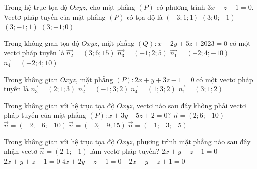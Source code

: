 \begin{ex}%
		Trong hệ trục tọa độ $Oxyz$, cho mặt phẳng $(P)$ có phương trình $3x-z+1=0$. Vectơ pháp tuyến của mặt phẳng $(P)$ có tọa độ là
	\choice
	{$(-3;1;1)$}
	{\True $(3;0;-1)$}
	{$(3;-1;1)$}
	{$(3;-1;0)$}
\end{ex}


\begin{ex}%
	Trong không gian tọa độ $Oxyz$, mặt phẳng $(Q) \colon x-2y+5z+2023=0$ có một vectơ pháp tuyến là
	\choice
	{$\overrightarrow{n_2}=(3;6;15)$}
	{$\overrightarrow{n_3}=(-1;2;5)$}
	{\True $\overrightarrow{n_1}=(-2;4;-10)$}
	{$\overrightarrow{n_4}=(-2;4;10)$}
\end{ex}

\begin{ex}%
Trong không gian $Oxyz$, mặt phẳng $(P) \colon 2x+y+3z-1=0$ có một vectơ pháp tuyến là
	\choice
	{$\overrightarrow{n_3}=(2;1;3)$}
	{$\overrightarrow{n_2}=(-1;3;2)$}
	{$\overrightarrow{n_4}=(1;3;2)$}
	{$\overrightarrow{n_1}=(3;1;2)$}
\end{ex}

\begin{ex}%
	Trong không gian với hệ trục tọa độ $Oxyz$, vectơ nào sau đây không phải vectơ pháp tuyến của mặt phẳng $(P) \colon x+3y-5z+2=0$?
	\choice
	{$\overrightarrow{n}=(2;6;-10)$}
	{\True $\overrightarrow{n}=(-2;-6;-10)$}
	{$\overrightarrow{n}=(-3;-9;15)$}
	{$\overrightarrow{n}=(-1;-3;-5)$}
\end{ex}
 \begin{ex}%
 		Trong không gian với hệ trục tọa độ $Oxyz$, phương trình mặt phẳng nào sau đây nhận vectơ $\overrightarrow{n}=(2;1;-1)$ làm vectơ pháp tuyến?
 	\choice
 	{\True $2x+y-z-1=0$}
 	{$2x+y+z-1=0$}
 	{$4x+2y-z-1=0$}
 	{$-2x-y-z+1=0$}
 \end{ex}

